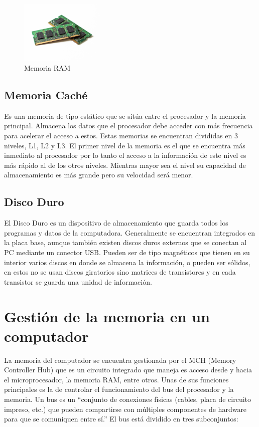 \documentclass{article}
\begin{document}
\begin{figure}[h]
\includegraphics[width=4cm]{memoriaRAM.jpg}
\centering
\caption{Memoria RAM}
\end{figure}

\subsection{Memoria Caché} 
Es una memoria de tipo estático que se sitúa entre el procesador y la memoria principal. Almacena los datos que el procesador debe acceder con más frecuencia para acelerar el acceso a estos. Estas memorias se encuentran divididas en 3 niveles, L1, L2 y L3. El primer nivel de la memoria es el que se encuentra más inmediato al procesador por lo tanto el acceso a la información de este nivel es más rápido al de los otros niveles. Mientras mayor sea el nivel su capacidad de almacenamiento es más grande pero su velocidad será menor.

\subsection{Disco Duro} 
El Disco Duro es un dispositivo de almacenamiento que guarda todos los programas y datos de la computadora.  Generalmente se encuentran integrados en la placa base, aunque también existen discos duros externos que se conectan al PC mediante un conector USB. Pueden ser de tipo magnéticos que tienen en su interior varios discos en donde se almacena la información, o pueden ser sólidos, en estos no se usan discos giratorios sino matrices de transistores y en cada transistor se guarda una unidad de información.


\section{Gestión de la memoria en un computador}
La memoria del computador se encuentra gestionada por el MCH (Memory Controller Hub)  que es un circuito integrado que maneja es acceso desde y hacia el microprocesador, la memoria RAM, entre otros. Unas de sus funciones principales es la de controlar el funcionamiento del bus del procesador y la memoria. Un bus es un ``conjunto de conexiones físicas (cables, placa de circuito impreso, etc.) que pueden compartirse con múltiples componentes de hardware para que se comuniquen entre sí.''\cite{bus} El bus está dividido en tres subconjuntos:
\end{document}
